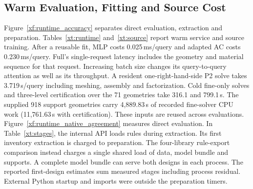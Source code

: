 \subsection{Warm Evaluation, Fitting and Source Cost}
Figure~\ref{xf:runtime_accuracy} separates direct evaluation, extraction and preparation. Tables~\ref{xt:runtime} and~\ref{xt:source} report warm service and source training. After a reusable fit, MLP costs 0.025\,ms/query and adapted AC costs 0.230\,ms/query. Full's single-request latency includes the geometry and material sequence for that request. Increasing batch size changes its query-to-query attention as well as its throughput. A resident one-right-hand-side P2 solve takes 3.719\,s/query including meshing, assembly and factorization. Cold fine-only solves and three-level certification over the 71 geometries take 316.1 and 799.1\,s. The supplied 918 support geometries carry 4,889.83\,s of recorded fine-solver CPU work (11,761.63\,s with certification). These inputs are reused across evaluations.
\clearpage
{}
{\renewcommand{\arraystretch}{0.86}}
Figure~\ref{xf:runtime_native_agreement} measures direct evaluation. In Table~\ref{xt:stages}, the internal API loads rules during extraction. Its first inventory extraction is charged to preparation. The four-library rule-export comparison instead charges a single shared load of data, model bundle and supports. A complete model bundle can serve both designs in each process. The reported first-design estimates sum measured stages including process residual. External Python startup and imports were outside the preparation timers.
\clearpage
